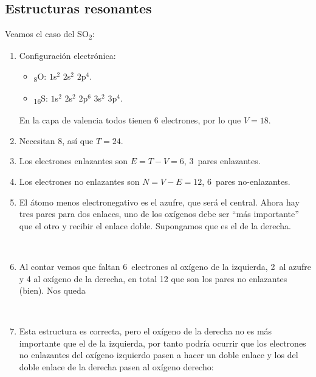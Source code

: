 \documentclass[twoside,a4paper,justified,12pt]{tufte-handout}
\renewcommand{\sb}[1]{\textsubscript{#1}}
\begin{document}
\subsection{Estructuras resonantes}

Veamos el caso del SO\sb{2}:

\begin{enumerate}[1)]
    \item Configuración electrónica:
    \begin{itemize}
        \item \sb{8}O: $1$s$^2$ $2$s$^2$ $2$p$^4$.
        \item \sb{16}S: $1$s$^2$ $2$s$^2$ $2$p$^6$ $3$s$^2$ $3$p$^4$.
    \end{itemize}
    
    En la capa de valencia todos tienen 6 electrones, por lo que $V=18$.
    
    \item Necesitan 8, así que $T=24$.
    
    \item Los electrones enlazantes son $E=T-V=6$, 3~pares enlazantes.
    
    \item Los electrones no enlazantes son $N=V-E=12$, 6~pares no-enlazantes.
    
    \item El átomo menos electronegativo es el azufre, que será el central. Ahora hay tres pares para dos enlaces, uno de los oxígenos debe ser ``más importante'' que el otro y recibir el enlace doble. Supongamos que es el de la derecha.
    
     {\centering{}\\}
     
    \item Al contar vemos que faltan 6~electrones al oxígeno de la izquierda, 2~al azufre y 4 al oxígeno de la derecha, en total 12 que son los pares no enlazantes (bien). Nos queda
    
      {\centering{}\\}
      
    \item Esta estructura es correcta, pero el oxígeno de la derecha no es más importante que el de la izquierda, por tanto podría ocurrir que los electrones no enlazantes del oxígeno izquierdo pasen a hacer un doble enlace y los del doble enlace de la derecha pasen al oxígeno derecho:
    

\end{enumerate}
\end{document}
